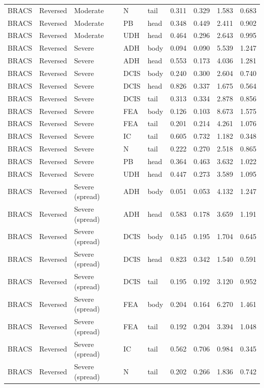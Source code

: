 \begin{longtable}{lllllrrrr}
BRACS & Reversed & Moderate & N & tail & 0.311 & 0.329 & 1.583 & 0.683 \\
BRACS & Reversed & Moderate & PB & head & 0.348 & 0.449 & 2.411 & 0.902 \\
BRACS & Reversed & Moderate & UDH & head & 0.464 & 0.296 & 2.643 & 0.995 \\
BRACS & Reversed & Severe & ADH & body & 0.094 & 0.090 & 5.539 & 1.247 \\
BRACS & Reversed & Severe & ADH & head & 0.553 & 0.173 & 4.036 & 1.281 \\
BRACS & Reversed & Severe & DCIS & body & 0.240 & 0.300 & 2.604 & 0.740 \\
BRACS & Reversed & Severe & DCIS & head & 0.826 & 0.337 & 1.675 & 0.564 \\
BRACS & Reversed & Severe & DCIS & tail & 0.313 & 0.334 & 2.878 & 0.856 \\
BRACS & Reversed & Severe & FEA & body & 0.126 & 0.103 & 8.673 & 1.575 \\
BRACS & Reversed & Severe & FEA & tail & 0.201 & 0.214 & 4.261 & 1.076 \\
BRACS & Reversed & Severe & IC & tail & 0.605 & 0.732 & 1.182 & 0.348 \\
BRACS & Reversed & Severe & N & tail & 0.222 & 0.270 & 2.518 & 0.865 \\
BRACS & Reversed & Severe & PB & head & 0.364 & 0.463 & 3.632 & 1.022 \\
BRACS & Reversed & Severe & UDH & head & 0.447 & 0.273 & 3.589 & 1.095 \\
BRACS & Reversed & Severe (spread) & ADH & body & 0.051 & 0.053 & 4.132 & 1.247 \\
BRACS & Reversed & Severe (spread) & ADH & head & 0.583 & 0.178 & 3.659 & 1.191 \\
BRACS & Reversed & Severe (spread) & DCIS & body & 0.145 & 0.195 & 1.704 & 0.645 \\
BRACS & Reversed & Severe (spread) & DCIS & head & 0.823 & 0.342 & 1.540 & 0.591 \\
BRACS & Reversed & Severe (spread) & DCIS & tail & 0.195 & 0.192 & 3.120 & 0.952 \\
BRACS & Reversed & Severe (spread) & FEA & body & 0.204 & 0.164 & 6.270 & 1.461 \\
BRACS & Reversed & Severe (spread) & FEA & tail & 0.192 & 0.204 & 3.394 & 1.048 \\
BRACS & Reversed & Severe (spread) & IC & tail & 0.562 & 0.706 & 0.984 & 0.345 \\
BRACS & Reversed & Severe (spread) & N & tail & 0.202 & 0.266 & 1.836 & 0.742 \\

\end{longtable}
